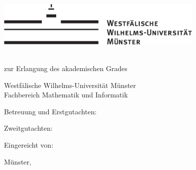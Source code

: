 
\thispagestyle{empty}

\hspace*{1em}
\vfill
	\begin{center}
			\includegraphics[width=10cm]{./images/wwu-logo-neu.pdf}
		\par
		\vspace*{8ex}
\Huge
			\textsc{\printtitel}
		\par
\normalsize
		\vspace*{8ex}
\large
			\textsc{\printartderarbeit}\\
\normalsize
			zur Erlangung des akademischen Grades\\
\large
			\textsc{\printstudiengrad}
		\par
\normalsize
		\vspace*{6ex}
			Westfälische Wilhelms-Universität Münster\\
			Fachbereich Mathematik und Informatik\\
			\printinstitut
	\end{center}
	\par
	\vspace*{12ex}
		Betreuung und Erstgutachten:\\
\large
			\textit{\printsbetreuer}
	\par
	\normalsize
	\vspace*{2ex}
		Zweitgutachten:\\
\large
			\textit{\printweitererbetreuer}			
	\par
\normalsize
	\vspace*{2ex}
		Eingereicht von:\\
\large
			\textit{\printname}
	\par
\normalsize
	\vspace*{4ex}
		Münster, \makeatletter
\month@ngerman
\makeatother~\the\year
\vfill
\hspace*{1em}